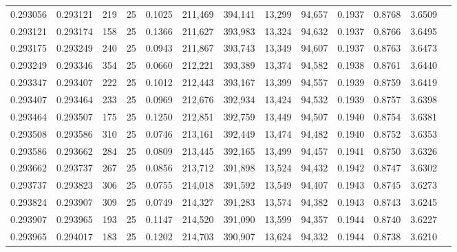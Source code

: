 \begin{tabular}{rrrrrrrrrrrrr}
0.293056 & 0.293121 &   219 &  25 &                                     0.1025 & 211,469 & 394,141 &  13,299 &  94,657 & 0.1937 & 0.8768 & 3.6509 \\
0.293121 & 0.293174 &   158 &  25 &                                     0.1366 & 211,627 & 393,983 &  13,324 &  94,632 & 0.1937 & 0.8766 & 3.6495 \\
0.293175 & 0.293249 &   240 &  25 &                                     0.0943 & 211,867 & 393,743 &  13,349 &  94,607 & 0.1937 & 0.8763 & 3.6473 \\
0.293249 & 0.293346 &   354 &  25 &                                     0.0660 & 212,221 & 393,389 &  13,374 &  94,582 & 0.1938 & 0.8761 & 3.6440 \\
0.293347 & 0.293407 &   222 &  25 &                                     0.1012 & 212,443 & 393,167 &  13,399 &  94,557 & 0.1939 & 0.8759 & 3.6419 \\
0.293407 & 0.293464 &   233 &  25 &                                     0.0969 & 212,676 & 392,934 &  13,424 &  94,532 & 0.1939 & 0.8757 & 3.6398 \\
0.293464 & 0.293507 &   175 &  25 &                                     0.1250 & 212,851 & 392,759 &  13,449 &  94,507 & 0.1940 & 0.8754 & 3.6381 \\
0.293508 & 0.293586 &   310 &  25 &                                     0.0746 & 213,161 & 392,449 &  13,474 &  94,482 & 0.1940 & 0.8752 & 3.6353 \\
0.293586 & 0.293662 &   284 &  25 &                                     0.0809 & 213,445 & 392,165 &  13,499 &  94,457 & 0.1941 & 0.8750 & 3.6326 \\
0.293662 & 0.293737 &   267 &  25 &                                     0.0856 & 213,712 & 391,898 &  13,524 &  94,432 & 0.1942 & 0.8747 & 3.6302 \\
0.293737 & 0.293823 &   306 &  25 &                                     0.0755 & 214,018 & 391,592 &  13,549 &  94,407 & 0.1943 & 0.8745 & 3.6273 \\
0.293824 & 0.293907 &   309 &  25 &                                     0.0749 & 214,327 & 391,283 &  13,574 &  94,382 & 0.1943 & 0.8743 & 3.6245 \\
0.293907 & 0.293965 &   193 &  25 &                                     0.1147 & 214,520 & 391,090 &  13,599 &  94,357 & 0.1944 & 0.8740 & 3.6227 \\
0.293965 & 0.294017 &   183 &  25 &                                     0.1202 & 214,703 & 390,907 &  13,624 &  94,332 & 0.1944 & 0.8738 & 3.6210 \\

\end{tabular}
